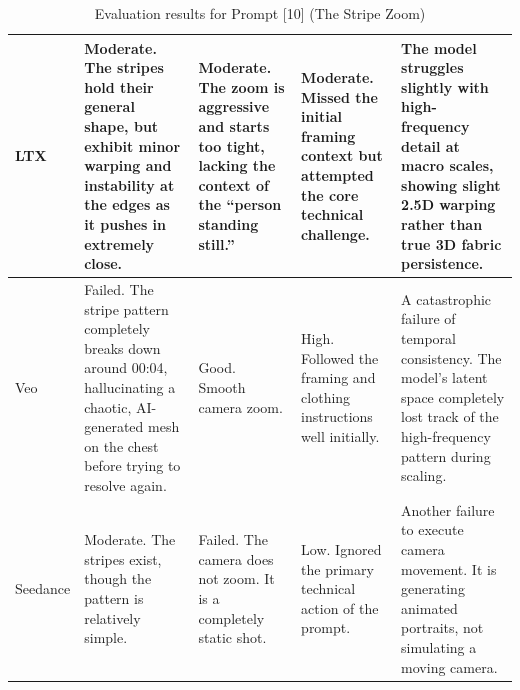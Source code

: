 \documentclass[sigconf]{acmart}
\begin{document}
\begin{table}[H]
\begin{tabularx}{\textwidth}{| l | >{\raggedright\arraybackslash}X | >{\raggedright\arraybackslash}X | >{\raggedright\arraybackslash}X | >{\raggedright\arraybackslash}X |}
        LTX            & Moderate. The stripes hold their general shape, but exhibit minor warping and instability at the edges as it pushes in extremely close.                 & Moderate. The zoom is aggressive and starts too tight, lacking the context of the ``person standing still.'' & Moderate. Missed the initial framing context but attempted the core technical challenge.                                                    & The model struggles slightly with high-frequency detail at macro scales, showing slight 2.5D warping rather than true 3D fabric persistence.  \\ \hline
        Veo            & Failed. The stripe pattern completely breaks down around 00:04, hallucinating a chaotic, AI-generated mesh on the chest before trying to resolve again. & Good. Smooth camera zoom.                                                                                    & High. Followed the framing and clothing instructions well initially.                                                                        & A catastrophic failure of temporal consistency. The model's latent space completely lost track of the high-frequency pattern during scaling.  \\ \hline
        Seedance       & Moderate. The stripes exist, though the pattern is relatively simple.                                                                                   & Failed. The camera does not zoom. It is a completely static shot.                                            & Low. Ignored the primary technical action of the prompt.                                                                                    & Another failure to execute camera movement. It is generating animated portraits, not simulating a moving camera.                              \\ \hline
    \end{tabularx}
    \caption{Evaluation results for Prompt [10] (The Stripe Zoom)}
    \label{tab:stripedshirt}
\end{table}
\end{document}
